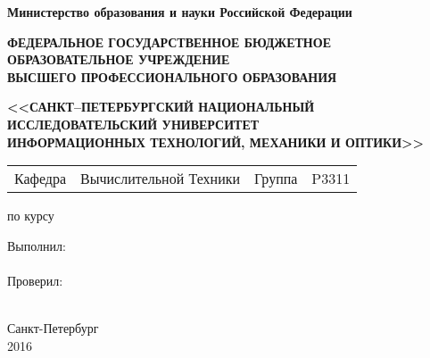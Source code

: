 \begin{titlepage}

\begin{center}

\textbf{Министерство образования и науки Российской Федерации}
\bigskip

\begin{scriptsize}
\textbf{ФЕДЕРАЛЬНОЕ ГОСУДАРСТВЕННОЕ БЮДЖЕТНОЕ ОБРАЗОВАТЕЛЬНОЕ УЧРЕЖДЕНИЕ \\
ВЫСШЕГО ПРОФЕССИОНАЛЬНОГО ОБРАЗОВАНИЯ}
\end{scriptsize}
\medskip

\textbf{<<САНКТ--ПЕТЕРБУРГСКИЙ НАЦИОНАЛЬНЫЙ ИССЛЕДОВАТЕЛЬСКИЙ УНИВЕРСИТЕТ \\
ИНФОРМАЦИОННЫХ ТЕХНОЛОГИЙ, МЕХАНИКИ И ОПТИКИ>>}

\vspace{35mm}

\begin{table}[h]
\centering
\def\arraystretch{0.75}
\begin{tabular}{cp{}cc}                      
Кафедра & \centering Вычислительной Техники & Группа & \hspace{0.5em} P3311 \hspace{0.5em} \\ \cline{2-2}\cline{4-4}
\end{tabular}
\end{table}

\vspace{20mm}

\begin{Large}
\textbf{\worktype}
\end{Large}

\medskip

\begin{large}
по курсу \coursename
\end{large}

\vspace{10mm}

\begin{large}
\textbf{\doctitle}
\end{large}

\vspace{45mm}

\begin{flushright}
Выполнил: \\
\medskip
\docauthorshort \\
\bigskip
Проверил: \\ \docsupervisor \\


\end{flushright}

\vfill

Санкт-Петербург \\
2016

\end{center}

\end{titlepage}